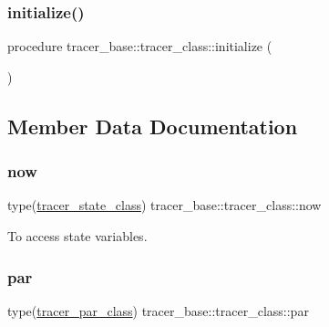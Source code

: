 \subsubsection{\texorpdfstring{initialize()}{initialize()}}
{\footnotesize\ttfamily procedure tracer\+\_\+base\+::tracer\+\_\+class\+::initialize (\begin{DoxyParamCaption}{ }\end{DoxyParamCaption})\hspace{0.3cm}{\ttfamily [private]}}



\subsection{Member Data Documentation}
\mbox{\label{structtracer__base_1_1tracer__class_aa0489335062707afec2dbbb978f0c68d}} 
\subsubsection{\texorpdfstring{now}{now}}
{\footnotesize\ttfamily type(\mbox{\hyperlink{structtracer__base_1_1tracer__state__class}{tracer\+\_\+state\+\_\+class}}) tracer\+\_\+base\+::tracer\+\_\+class\+::now\hspace{0.3cm}{\ttfamily [private]}}



To access state variables. 

\mbox{\label{structtracer__base_1_1tracer__class_a65acca4d35b24ec0b60eb32574004364}} 
\subsubsection{\texorpdfstring{par}{par}}
{\footnotesize\ttfamily type(\mbox{\hyperlink{structtracer__base_1_1tracer__par__class}{tracer\+\_\+par\+\_\+class}}) tracer\+\_\+base\+::tracer\+\_\+class\+::par\hspace{0.3cm}{\ttfamily [private]}}



